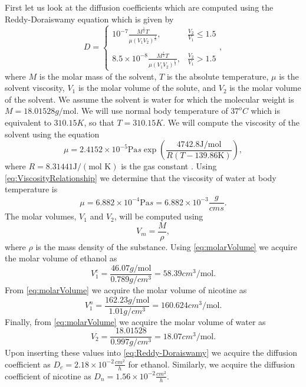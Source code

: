 \documentclass[\main/thesis.tex]{subfiles}
\begin{document}
First let us look at the diffusion coefficients which are computed using the Reddy-Doraiswamy equation \cite{Reddy} which is given by
\begin{equation}
D {=} 
\begin{cases}
  10^{-7} \frac{M^{\frac{1}{2}} T}{\mu (V_1 V_2)^{\frac{1}{3}}}, & \frac{V_2}{V_1} {\le} 1.5 \\ \\
  8.5 {\times} 10^{-8} \frac{M^{\frac{1}{2}} T}{\mu (V_1 V_2)^{\frac{1}{3}}}, & \frac{V_2}{V_1} > 1.5
\end{cases},
\label{eq:Reddy-Doraiswamy}
\end{equation}
where $M$ is the molar mass of the solvent, $T$ is the absolute temperature, $\mu$ is the solvent viscosity, $V_1$ is the molar volume of the solute, and $V_2$ is the molar volume of the solvent. We assume the solvent is water for which the molecular weight is $M {=} 18.01528 g/\text{mol}$. We will use normal body temperature of $37^o C$ which is equivalent to $310.15 K$, so that $T {=} 310.15 K$. We will compute the viscosity of the solvent using the equation
\begin{equation}
\mu {=} 2.4152{\times}10^{-5} \text{Pa} s \exp\left(\frac{4742.8 \text{J}/\text{mol}}{R(T-139.86 \text{K})}\right),
\label{eq:ViscosityRelationship}
\end{equation}
where $R {=} 8.31441 \text{J}/(\text{mol K})$ is the gas constant \cite{FogelSon}.
Using \eqref{eq:ViscosityRelationship} we determine that the viscosity of water at body temperature is
$$\mu {=} 6.882 {\times} 10^{-4} \text{Pa} s {=} 6.882 {\times} 10^{-3} \frac{g}{cm s}.$$ 
The molar volumes, $V_1$ and $V_2$, will be computed using
\begin{equation}
    V_m {=} \frac{M}{\rho},
    \label{eq:molarVolume}
\end{equation}
where $\rho$ is the mass density of the substance. 
Using \eqref{eq:molarVolume} we acquire the molar volume of ethanol as
$$V_1^e {=}  \frac{46.07 g/\text{mol}}{0.789 g/cm^3} {=} 58.39 cm^3/\text{mol}.$$
From \eqref{eq:molarVolume} we acquire the molar volume of nicotine as
$$V_1^n {=} \frac{162.23 g/\text{mol}}{1.01 g/cm^3} {=} 160.624 cm^3/\text{mol}.$$
Finally, from \eqref{eq:molarVolume} we acquire the molar volume of water as
$$V_2 {=} \frac{18.01528}{0.997 g/cm^3} {=} 18.07 cm^3/\text{mol}.$$
Upon inserting these values into \eqref{eq:Reddy-Doraiswamy} we acquire the diffusion coefficient as $D_e {=} 2.18{\times}10^{-2} \frac{cm^2}{h}$ for ethanol. Similarly, we acquire the diffusion coefficient of nicotine as $D_n {=} 1.56{\times}10^{-2} \frac{cm^2}{h}$.
\end{document}
